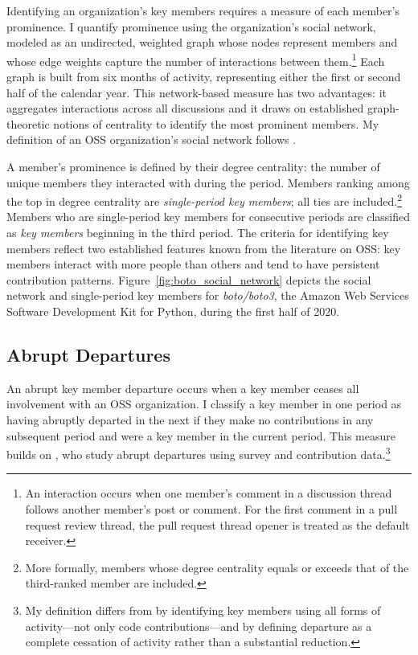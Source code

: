 \documentclass[12pt,notitlepage]{article}
\begin{document}
Identifying an organization's key members requires a measure of each member’s prominence.
I quantify prominence using the organization’s social network, modeled as an undirected, weighted graph whose nodes represent members and whose edge weights capture the number of interactions between them.\footnote{An interaction occurs when one member’s comment in a discussion thread follows another member’s post or comment. 
For the first comment in a pull request review thread, the pull request thread opener is treated as the default receiver.}
Each graph is built from six months of activity, representing either the first or second half of the calendar year.
This network-based measure has two advantages: it aggregates interactions across all discussions and it draws on established graph-theoretic notions of centrality to identify the most prominent members.
My definition of an OSS organization’s social network follows \cite{crowston_hierarchy_2006}. 



A member’s prominence is defined by their degree centrality: the number of unique members they interacted with during the period.
Members ranking among the top \TopKWord{} in degree centrality are \textit{single-period key members}; all ties are included.\footnote{More formally, members whose degree centrality equals or exceeds that of the third-ranked member are included.} 
Members who are single-period key members for \MinConsecutiveWord{} consecutive periods are classified as \textit{key members} beginning in the third period.
The criteria for identifying key members reflect two established features known from the literature on OSS: key members interact with more people than others and tend to have persistent contribution patterns. 
Figure~\ref{fig:boto_social_network} depicts the social network and single-period key members for \textit{boto/boto3}, the Amazon Web Services Software Development Kit for Python, during the first half of 2020. 

\subsection{Abrupt Departures} \label{sec:abrupt_departures}
An abrupt key member departure occurs when a key member ceases all involvement with an OSS organization.
I classify a key member in one period as having abruptly departed in the next if they make no contributions in any subsequent period and were a key member in the current period.
This measure builds on \cite{miller_why_2019}, who study abrupt departures using survey and contribution data.\footnote{My definition differs from \cite{miller_why_2019} by identifying key members using all forms of activity—not only code contributions—and by defining departure as a complete cessation of activity rather than a substantial reduction.}
\end{document}
